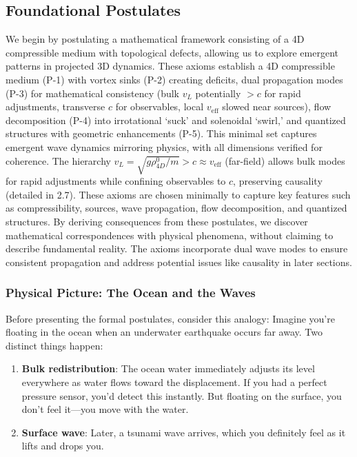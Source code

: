 \subsection{Foundational Postulates}

We begin by postulating a mathematical framework consisting of a 4D compressible medium with topological defects, allowing us to explore emergent patterns in projected 3D dynamics. These axioms establish a 4D compressible medium (P-1) with vortex sinks (P-2) creating deficits, dual propagation modes (P-3) for mathematical consistency (bulk $v_L$ potentially $>c$ for rapid adjustments, transverse $c$ for observables, local $v_{\text{eff}}$ slowed near sources), flow decomposition (P-4) into irrotational `suck' and solenoidal `swirl,' and quantized structures with geometric enhancements (P-5). This minimal set captures emergent wave dynamics mirroring physics, with all dimensions verified for coherence. The hierarchy $v_L = \sqrt{g \rho_{4D}^0 / m} > c \approx v_{\text{eff}}$ (far-field) allows bulk modes for rapid adjustments while confining observables to $c$, preserving causality (detailed in 2.7). These axioms are chosen minimally to capture key features such as compressibility, sources, wave propagation, flow decomposition, and quantized structures. By deriving consequences from these postulates, we discover mathematical correspondences with physical phenomena, without claiming to describe fundamental reality. The axioms incorporate dual wave modes to ensure consistent propagation and address potential issues like causality in later sections.

\subsubsection{Physical Picture: The Ocean and the Waves}

Before presenting the formal postulates, consider this analogy: Imagine you're floating in the ocean when an underwater earthquake occurs far away. Two distinct things happen:

\begin{enumerate}
\item \textbf{Bulk redistribution}: The ocean water immediately adjusts its level everywhere as water flows toward the displacement. If you had a perfect pressure sensor, you'd detect this instantly. But floating on the surface, you don't feel it—you move with the water.
\item \textbf{Surface wave}: Later, a tsunami wave arrives, which you definitely feel as it lifts and drops you.
\end{enumerate}

